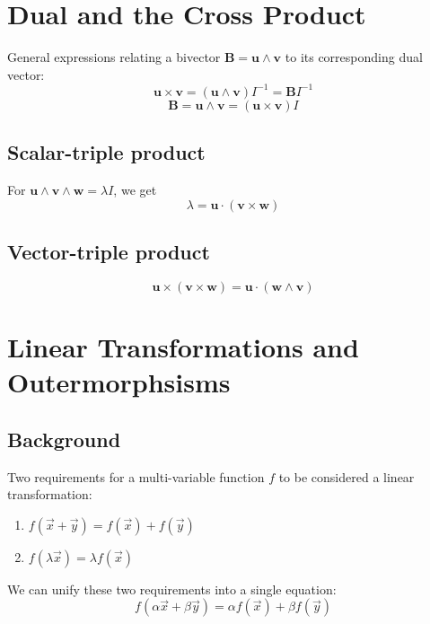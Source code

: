 \documentclass[a4paper]{article}
\begin{document}
\section*{Dual and the Cross Product}
General expressions relating a bivector $\mathbf{B} = \mathbf{u} \wedge \mathbf{v}$ to its corresponding dual vector:
    \begin{equation}
        \mathbf{u} \times \mathbf{v} = (\mathbf{u} \wedge \mathbf{v})I^{-1} = \mathbf{B}I^{-1}
    \end{equation}
    \begin{equation}
        \mathbf{B} = \mathbf{u} \wedge \mathbf{v} = (\mathbf{u} \times \mathbf{v})I
    \end{equation}
\subsection*{Scalar-triple product}
For $\mathbf{u} \wedge \mathbf{v} \wedge \mathbf{w} = \lambda I$, we get
    \begin{equation}
        \lambda = \mathbf{u} \cdot (\mathbf{v} \times \mathbf{w})
    \end{equation}
\subsection*{Vector-triple product}
    \begin{equation}
        \mathbf{u} \times (\mathbf{v} \times \mathbf{w}) = \mathbf{u} \cdot (\mathbf{w} \wedge \mathbf{v})
    \end{equation}
\section*{Linear Transformations and Outermorphsisms}
\subsection*{Background}
Two requirements for a multi-variable function $f$ to be considered a linear transformation:
    \begin{enumerate}
        \item $f(\vec{x} + \vec{y}) = f(\vec{x}) + f(\vec{y})$
        \item $f(\lambda\vec{x}) = \lambda f(\vec{x})$
    \end{enumerate}
We can unify these two requirements into a single equation:
    \begin{equation}
        f(\alpha \vec{x} + \beta \vec{y}) = \alpha f(\vec{x}) + \beta f(\vec{y})
    \end{equation}
\end{document}

